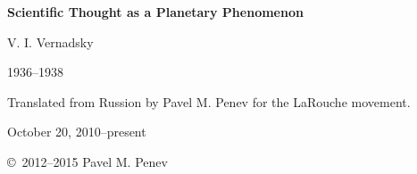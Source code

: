 \begin{titlepage}

\begin{center}
\Huge\textbf{Scientific Thought as a Planetary Phenomenon}


\bigskip
\LARGE{V. I. Vernadsky}

\Large{1936--1938}


\bigskip
\Large{Translated from Russion by Pavel M. Penev for the LaRouche movement.}
\foreignlanguage{russian}{\nocite{vernadsky2001thought}}

October 20, 2010--present

\vfill

\copyright\ 2012--2015 Pavel M. Penev

\end{center}

\end{titlepage}
